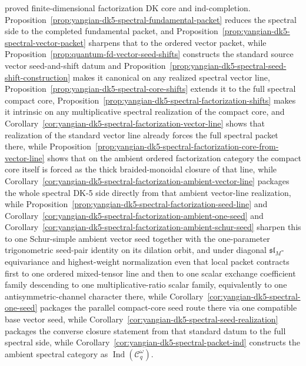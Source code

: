 \begin{remark}
\begin{itemize}
  proved finite-dimensional factorization DK core and ind-completion.
  Proposition~\ref{prop:yangian-dk5-spectral-fundamental-packet}
  reduces the spectral side to the completed fundamental packet, and
  Proposition~\ref{prop:yangian-dk5-spectral-vector-packet}
  sharpens that to the ordered vector packet, while
  Proposition~\ref{prop:quantum-fd-vector-seed-shifts} constructs the
  standard source vector seed-and-shift datum and
  Proposition~\ref{prop:yangian-dk5-spectral-seed-shift-construction}
  makes it canonical on any realized spectral vector line,
  Proposition~\ref{prop:yangian-dk5-spectral-core-shifts}
  extends it to the full spectral compact core,
  Proposition~\ref{prop:yangian-dk5-spectral-factorization-shifts}
  makes it intrinsic on any multiplicative spectral realization of the
  compact core, and
  Corollary~\ref{cor:yangian-dk5-spectral-factorization-vector-line}
  shows that realization of the standard vector line already forces
  the full spectral packet there,
  while
  Proposition~\ref{prop:yangian-dk5-spectral-factorization-core-from-vector-line}
  shows that on the ambient ordered factorization category the compact
  core itself is forced as the thick braided-monoidal closure of that
  line,
  while
  Corollary~\ref{cor:yangian-dk5-spectral-factorization-ambient-vector-line}
  packages the whole spectral DK-5 side directly from that ambient
  vector-line realization,
  while
  Proposition~\ref{prop:yangian-dk5-spectral-factorization-seed-line}
  and
  Corollary~\ref{cor:yangian-dk5-spectral-factorization-ambient-one-seed}
  and
  Corollary~\ref{cor:yangian-dk5-spectral-factorization-ambient-schur-seed}
  sharpen this to one Schur-simple ambient vector seed together with
  the one-parameter trigonometric seed-pair identity on its dilation
  orbit, and under diagonal \(\mathfrak{sl}_M\)-equivariance and
  highest-weight normalization even that local packet contracts first
  to one ordered mixed-tensor line and then to one scalar exchange
  coefficient family descending to one multiplicative-ratio scalar
  family, equivalently to one antisymmetric-channel character there,
  while Corollary~\ref{cor:yangian-dk5-spectral-one-seed}
  packages the parallel compact-core seed route there via one
  compatible base vector seed,
  while
  Corollary~\ref{cor:yangian-dk5-spectral-seed-realization}
  packages the converse closure statement from that standard datum to
  the full spectral side, while
  Corollary~\ref{cor:yangian-dk5-spectral-packet-ind} constructs the
  ambient spectral category as
  \(\operatorname{Ind}(\mathcal{C}_q^\omega)\).

\end{itemize}
\end{remark}
